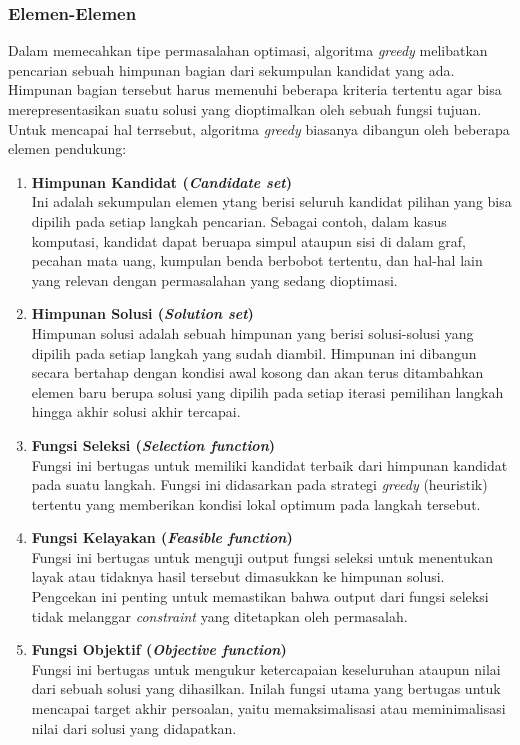 \subsubsection{Elemen-Elemen}
Dalam memecahkan tipe permasalahan optimasi, algoritma \textit{greedy} melibatkan pencarian sebuah himpunan bagian dari sekumpulan kandidat yang ada. Himpunan bagian tersebut harus memenuhi beberapa kriteria tertentu agar bisa merepresentasikan suatu solusi yang dioptimalkan oleh sebuah fungsi tujuan. 
Untuk mencapai hal terrsebut, algoritma \textit{greedy} biasanya dibangun oleh beberapa elemen pendukung: 
\begin{enumerate}
    \item \textbf{Himpunan Kandidat (\textit{Candidate set})} \\
        Ini adalah sekumpulan elemen ytang berisi seluruh kandidat pilihan yang bisa dipilih pada setiap langkah pencarian. Sebagai contoh, dalam kasus komputasi, kandidat dapat beruapa simpul ataupun sisi di dalam graf, pecahan mata uang, kumpulan benda berbobot tertentu, dan hal-hal lain yang relevan dengan permasalahan yang sedang dioptimasi.
    \item \textbf{Himpunan Solusi (\textit{Solution set})} \\
        Himpunan solusi adalah sebuah himpunan yang berisi solusi-solusi yang dipilih pada setiap langkah yang sudah diambil. Himpunan ini dibangun secara bertahap dengan kondisi awal kosong dan akan terus ditambahkan elemen baru berupa solusi yang dipilih pada setiap iterasi pemilihan langkah hingga akhir solusi akhir tercapai.
    \item \textbf{Fungsi Seleksi (\textit{Selection function})} \\
        Fungsi ini bertugas untuk memiliki kandidat terbaik dari himpunan kandidat pada suatu langkah. Fungsi ini didasarkan pada strategi \textit{greedy} (heuristik) tertentu yang memberikan kondisi lokal optimum pada langkah tersebut.
    \item \textbf{Fungsi Kelayakan (\textit{Feasible function})} \\
        Fungsi ini bertugas untuk menguji output fungsi seleksi untuk menentukan layak atau tidaknya hasil tersebut dimasukkan ke himpunan solusi. Pengcekan ini penting untuk memastikan bahwa output dari fungsi seleksi tidak melanggar \textit{constraint} yang ditetapkan oleh permasalah.
    \item \textbf{Fungsi Objektif (\textit{Objective function})} \\
        Fungsi ini bertugas untuk mengukur ketercapaian keseluruhan ataupun nilai dari sebuah solusi yang dihasilkan. Inilah fungsi utama yang bertugas untuk mencapai target akhir persoalan, yaitu memaksimalisasi atau meminimalisasi nilai dari solusi yang didapatkan.
\end{enumerate}

